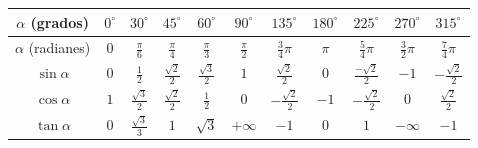 \documentclass[addpoints]{exam}
\newcommand{\grado}[0]{^{\circ}}
\begin{document}
    \begin{table}[ht]
        \centering
        \begin{tabular}{|c|cccccccccc|}
            \hline
            $\alpha$ (grados)   & $0\grado$ &  $30\grado$ & $45\grado$ & $60\grado$ & $90\grado$ & $135\grado$ & $180\grado$ & $225\grado$ & $270\grado$ & $315\grado$ \\
            \hline
            $\alpha$ (radianes) &   $0$    &  $\frac{\pi}{6}$ & $\frac{\pi}{4}$ & $\frac{\pi}{3}$ & $\frac{\pi}{2}$ & $\frac{3}{4} \pi$ & $\pi$ & $\frac{5}{4} \pi$ & $\frac{3}{2} \pi$ & $\frac{7}{4} \pi$ \\
            \hline
            $\sin \alpha$       &   $0$    & $\frac{1}{2}$ & $\frac{\sqrt{2}}{2}$ & $\frac{\sqrt{3}}{2}$ & $1$ & $\frac{\sqrt{2}}{2}$ & $0$ & $\frac{-\sqrt{2}}{2}$ & $-1$ & $-\frac{\sqrt{2}}{2}$ \\
            $\cos \alpha$       &   $1$    & $\frac{\sqrt{3}}{2}$ & $\frac{\sqrt{2}}{2}$ & $\frac{1}{2}$ & $0$ & $-\frac{\sqrt{2}}{2}$ & $-1$ & $-\frac{\sqrt{2}}{2}$ & $0$ & $\frac{\sqrt{2}}{2}$ \\
            $\tan \alpha$       &   $0$    & $\frac{\sqrt{3}}{3}$ & $1$ & $\sqrt{3}$ & $+\infty$ & $-1$ & $0$ & $1$ & $-\infty$ & $-1$ \\
            \hline  
        \end{tabular}
    \end{table}
\end{document}
